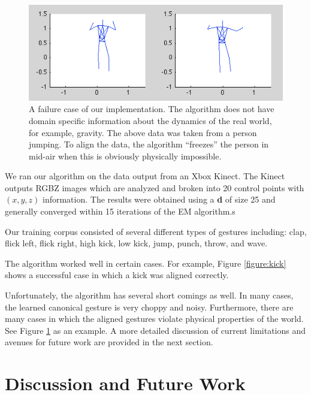 \documentclass{article}
\begin{document}
\begin{figure}
\begin{centering}
\includegraphics[width=\columnwidth]{figures/jump.png}

\caption{A failure case of our implementation. The algorithm does not have
domain specific information about the dynamics of the real world, for example,
gravity. The above data was taken from a person jumping. To align the data,
the algorithm ``freezes'' the person in mid-air when this is obviously
physically impossible. \label{figure:jump}}

\end{centering}
\end{figure}

We ran our algorithm on the data output from an Xbox Kinect. The Kinect outputs
RGBZ images which are analyzed and broken into 20 control points with
$\left(x,y,z\right)$ information. The results were obtained using a \textbf{d}
of size 25 and generally converged within 15 iterations of the EM algorithm.s

Our training corpus consisted of several different types of gestures including:
clap, flick left, flick right, high kick, low kick, jump, punch, throw, and
wave. 

The algorithm worked well in certain cases. For example, Figure
\ref{figure:kick} shows a successful case in which a kick was aligned correctly.

Unfortunately, the algorithm has several short comings as well. In many cases,
the learned canonical gesture is very choppy and noisy. Furthermore, there are
many cases in which the aligned gestures violate physical properties of the
world. See Figure \ref{figure:jump} as an example. A more detailed discussion of
current limitations and avenues for future work are provided in the next
section.




\section{Discussion and Future Work}
\end{document}
